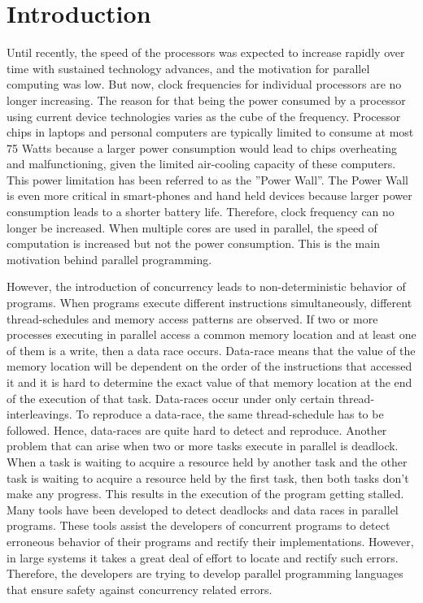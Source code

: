 \section{Introduction}

Until recently, the speed of the processors was expected to increase rapidly over time with sustained technology advances, and the motivation for parallel computing was low. But now, clock frequencies for individual processors are no longer increasing. The reason for that being the power consumed by a processor using current device technologies varies as the cube of the frequency. Processor chips in laptops and personal computers are typically limited to consume at most 75 Watts because a larger power consumption would lead to chips overheating and malfunctioning, given the limited air-cooling capacity of these computers. This power limitation has been referred to as the ''Power Wall''. The Power Wall is even more critical in smart-phones and hand held devices because larger power consumption leads to a shorter battery life. Therefore, clock frequency can no longer be increased. When multiple cores are used in parallel, the speed of computation is increased but not the power consumption. This is the main motivation behind parallel programming.

 However, the introduction of concurrency leads to non-deterministic behavior of programs. When programs execute different instructions simultaneously, different thread-schedules and memory access patterns are observed. If two or more processes executing in parallel access a common memory location and at least one of them is a write, then a data race occurs. Data-race means that the value of the memory location will be dependent on the order of the instructions that accessed it and it is hard to determine the exact value of that memory location at the end of the execution of that task. Data-races occur under only certain thread-interleavings. To reproduce a data-race, the same thread-schedule has to be followed. Hence, data-races are quite hard to detect and reproduce. Another problem that can arise when two or more tasks execute in parallel is deadlock. When a task is waiting to acquire a resource held by another task and the other task is waiting to acquire a resource held by the first task, then both tasks don't make any progress. This results in the execution of the program getting stalled. Many tools have been developed to detect deadlocks and data races in parallel programs. These tools assist the developers of concurrent programs to detect erroneous behavior of their programs and rectify their implementations. However, in large systems it takes a great deal of effort to locate and rectify such errors. Therefore, the developers are trying to develop parallel programming languages that ensure safety against concurrency related errors. 
 
